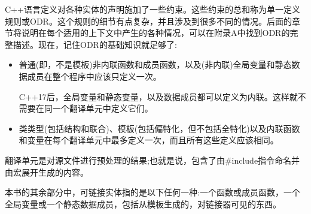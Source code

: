 C++语言定义对各种实体的声明施加了一些约束。这些约束的总和称为单一定义规则或ODR。这个规则的细节有点复杂，并且涉及到很多不同的情况。后面的章节将说明在每个适用的上下文中产生的各种情况，可以在附录A中找到ODR的完整描述。现在，记住ODR的基础知识就足够了:

\begin{itemize}
\item 
普通(即，不是模板)非内联函数和成员函数，以及(非内联)全局变量和静态数据成员在整个程序中应该只定义一次。

\begin{tcolorbox}[colback=webgreen!5!white,colframe=webgreen!75!black]
\hspace*{0.75cm}C++17后，全局变量和静态变量，以及数据成员都可以定义为内联。这样就不需要在同一个翻译单元中定义它们。
\end{tcolorbox}

\item 
类类型(包括结构和联合)、模板(包括偏特化，但不包括全特化)以及内联函数和变量在每个翻译单元中最多定义一次，而且所有这些定义应该相同。
\end{itemize}

翻译单元是对源文件进行预处理的结果;也就是说，包含了由\#include指令命名并由宏展开生成的内容。

本书的其余部分中，可链接实体指的是以下任何一种:一个函数或成员函数，一个全局变量或一个静态数据成员，包括从模板生成的，对链接器可见的东西。




































